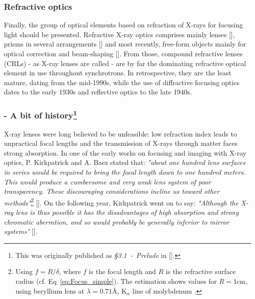 \begin{refsection}
\subsubsection*{Refractive optics}

Finally, the group of optical elements based on refraction of X-rays for focusing light should be presented. Refractive X-ray optics comprises mainly lenses [\cite{Snigirev1996}], prisms in several arrangements [\cite{Cederstrom2000, Jark2004}] and most recently, free-form objects mainly for optical correction and beam-shaping [\cite{Seiboth2017, Zverev2017, Markus2018, Seiboth2019, Seiboth2020, Dhamgaye2020}]. From those, compound refractive lenses (CRLs) - as X-ray lenses are called - are by far the dominating refractive optical element in use throughout synchrotrons. In retrospective, they are the least mature, dating from the mid-1990s, while the use of diffractive focusing optics dates to the early 1930s and reflective optics to the late 1940s. 


\subsubsection*{- A bit of history\footnote{This was originally published as \textit{§3.1~-~Prelude} in [\cite{Celestre2017}].}}
X-ray lenses were long believed to be unfeasible: low refraction index leads to unpractical focal lengths and the transmission of X-rays through matter faces strong absorption. In one of the early works on focusing and imaging with X-ray optics, P. Kirkpatrick and A. Baez stated that: \textit{"about one hundred lens surfaces in series would be required to bring the focal length down to one hundred meters. This would produce a cumbersome and very weak lens system of poor transparency. These discouraging considerations incline us toward other methods"}\footnote{Using $f=R/\delta$, where $f$ is the focal length and $R$ is the refractive surface radius (cf. Eq~\ref{eq:Focus_simple}). The estimation shows values for $R=1$cm, using beryllium lens at $\lambda=0.71$\r{A}, K$_{\alpha}$ line of molybdenum \cite{Kirkpatrick1948}.} [\cite{Kirkpatrick1948}]. On the following year, Kirkpatrick went on to say: \textit{"Although the X-ray lens is thus possible it has the disadvantages of high absorption and strong chromatic aberration, and so would probably be generally inferior to mirror systems"} [\cite{Kirkpatrick1949}]. 


\end{refsection}
